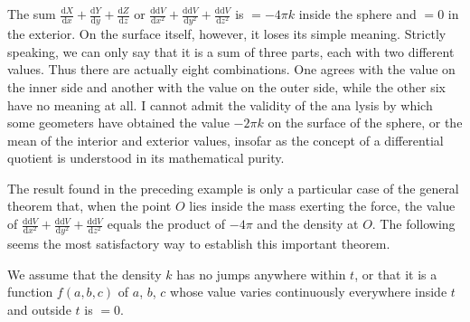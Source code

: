 The sum $\frac{\mathrm{d}X}{\mathrm{d}x}+\frac{\mathrm{d}Y}{\mathrm{d}y}+\frac{\mathrm{d}Z}{\mathrm{d}z}$ or $\frac{\mathrm{d}\mathrm{d}V}{\mathrm{d}x^2}+\frac{\mathrm{d}\mathrm{d}V}{\mathrm{d}y^2}+\frac{\mathrm{d}\mathrm{d}V}{\mathrm{d}z^2}$ is $=-4\pi k$ inside the sphere and $=0$ in the exterior. On the surface itself, however, it loses its simple meaning. Strictly speaking, we can only say that it is a sum of three parts, each with two different values. Thus there are actually eight combinations. One agrees with the value on the inner side and another with the value on the outer side, while the other six have no meaning at all. I cannot admit the validity of the ana%
lysis by which some geometers have obtained the value $-2\pi k$ on the surface of the sphere, or the mean of the interior and exterior values, insofar as the concept of a differential quotient is understood in its mathematical purity.

The result found in the preceding example is only a particular case of the general theorem that, when the point $O$ lies inside the mass exerting the force, the value of $\frac{\mathrm{d}\mathrm{d}V}{\mathrm{d}x^2}+\frac{\mathrm{d}\mathrm{d}V}{\mathrm{d}y^2}+\frac{\mathrm{d}\mathrm{d}V}{\mathrm{d}z^2}$ equals the product of $-4\pi$ and the density at $O$. The following seems the most satisfactory way to establish this important theorem.

We assume that the density $k$ has no jumps anywhere within $t$, or that it is a function $f(a,b,c)$ of $a$, $b$, $c$ whose value varies continuously everywhere inside $t$ and outside $t$ is $=0$.

